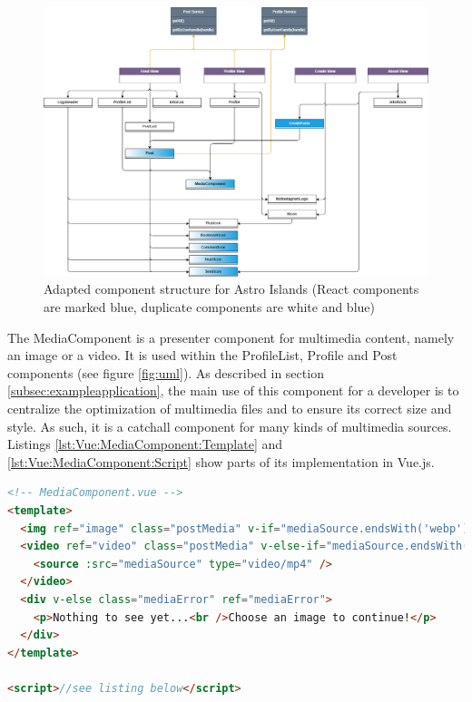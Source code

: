 \documentclass[a4paper, 10pt]{article}
\begin{document}
\begin{figure}
  \begin{center}
    \includegraphics[width=\linewidth]{diagrams/uml-astro.png}
  \end{center}
  \caption{Adapted component structure for Astro Islands (React components are marked blue, duplicate components are white and blue)}\label{fig:astroUml}
\end{figure}

The MediaComponent is a presenter component for multimedia content, namely an image or a video.
It is used within the ProfileList, Profile and Post components (see figure \ref{fig:uml}).
As described in section \ref{subsec:exampleapplication}, the main use of this component for a developer is to centralize the optimization of multimedia files and to ensure its correct size and style.
As such, it is a catchall component for many kinds of multimedia sources. Listings \ref{lst:Vue:MediaComponent:Template} and \ref{lst:Vue:MediaComponent:Script} show parts of its implementation in Vue.js.

\begin{lstlisting}[caption=MediaComponent in Vue.js (Template), label={lst:Vue:MediaComponent:Template}, language=HTML]
<!-- MediaComponent.vue -->
<template>
  <img ref="image" class="postMedia" v-if="mediaSource.endsWith('webp')" :alt="alt" :width="width" :height="height" :loading="eagerLoading ? 'eager' : 'lazy'" :src="mediaSource" />
  <video ref="video" class="postMedia" v-else-if="mediaSource.endsWith('mp4')" :width="width" :preload="eagerLoading ? 'auto' : 'metadata'" controls controlslist="nodownload,nofullscreen,noremoteplayback" disablepictureinpicture loop muted >
    <source :src="mediaSource" type="video/mp4" />
  </video>
  <div v-else class="mediaError" ref="mediaError">
    <p>Nothing to see yet...<br />Choose an image to continue!</p>
  </div>
</template>
  
<script>//see listing below</script>
\end{lstlisting}
\end{document}
